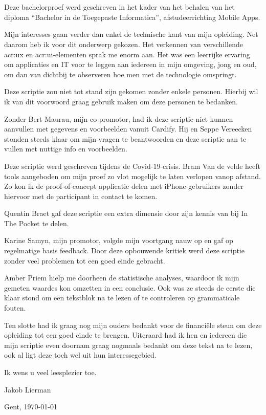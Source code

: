 
\chapter*{}
\label{ch:voorwoord}

Deze bachelorproef werd geschreven in het kader van het behalen van het diploma ``Bachelor in de Toegepaste Informatica'', afstudeerrichting Mobile Apps.

Mijn interesses gaan verder dan enkel de technische kant van mijn opleiding. Net daarom heb ik voor dit onderwerp gekozen. Het verkennen van verschillende \acrshort{acr:ux} en \acrshort{acr:ui}-elementen sprak me enorm aan. Het was een leerrijke ervaring om applicaties en IT voor te leggen aan iedereen in mijn omgeving, jong en oud, om dan van dichtbij te observeren hoe men met de technologie omspringt.

Deze scriptie zou niet tot stand zijn gekomen zonder enkele personen. Hierbij wil ik van dit voorwoord graag gebruik maken om deze personen te bedanken. 

Zonder Bert Maurau, mijn co-promotor, had ik deze scriptie niet kunnen aanvullen met gegevens en voorbeelden vanuit Cardify. Hij en Seppe Vereecken stonden steeds klaar om mijn vragen te beantwoorden en deze scriptie aan te vullen met nuttige info en voorbeelden.

Deze scriptie werd geschreven tijdens de Covid-19-crisis. Bram Van de velde heeft tools aangeboden om mijn proef zo vlot mogelijk te laten verlopen vanop afstand. Zo kon ik de proof-of-concept applicatie delen met iPhone-gebruikers zonder hiervoor met de participant in contact te komen.

Quentin Braet gaf deze scriptie een extra dimensie door zijn kennis van bij In The Pocket te delen.

Karine Samyn, mijn promotor, volgde mijn voortgang nauw op en gaf op regelmatige basis feedback. Door deze opbouwende kritiek werd deze scriptie zonder veel problemen tot een goed einde gebracht.

Amber Priem hielp me doorheen de statistische analyses, waardoor ik mijn gemeten waardes kon omzetten in een conclusie. Ook was ze steeds de eerste die klaar stond om een tekstblok na te lezen of te controleren op grammaticale fouten.

Ten slotte had ik graag nog mijn ouders bedankt voor de financiële steun om deze opleiding tot een goed einde te brengen. Uiteraard had ik hen en iedereen die mijn scriptie even doornam graag nogmaals bedankt om deze tekst na te lezen, ook al ligt deze toch wel uit hun interessegebied.

Ik wens u veel leesplezier toe.

Jakob Lierman

Gent, \shortdate\today


